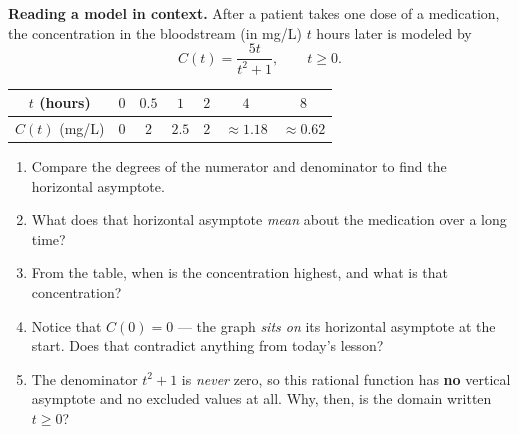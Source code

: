 \documentclass[10pt]{article}
\begin{document}
\begin{extensionbox}
\textbf{Reading a model in context.} After a patient takes one dose of a medication, the concentration
in the bloodstream (in mg/L) $t$ hours later is modeled by
\[
  C(t) = \frac{5t}{t^2+1}, \qquad t \ge 0 .
\]
\begin{center}
\renewcommand{\arraystretch}{1.25}
\begin{tabular}{|c|c|c|c|c|c|c|}
\hline
$t$ (hours) & $0$ & $0.5$ & $1$ & $2$ & $4$ & $8$ \\ \hline
$C(t)$ (mg/L) & $0$ & $2$ & $2.5$ & $2$ & $\approx 1.18$ & $\approx 0.62$ \\ \hline
\end{tabular}
\end{center}
\begin{enumerate}[label=(\alph*), leftmargin=1.8em, itemsep=5pt]
  \item Compare the degrees of the numerator and denominator to find the horizontal asymptote.
  \item What does that horizontal asymptote \emph{mean} about the medication over a long time?
  \item From the table, when is the concentration highest, and what is that concentration?
  \item Notice that $C(0)=0$ --- the graph \emph{sits on} its horizontal asymptote at the start. Does
        that contradict anything from today's lesson?
  \item The denominator $t^2+1$ is \emph{never} zero, so this rational function has \textbf{no}
        vertical asymptote and no excluded values at all. Why, then, is the domain written $t\ge 0$?
\end{enumerate}
\end{extensionbox}
\end{document}

